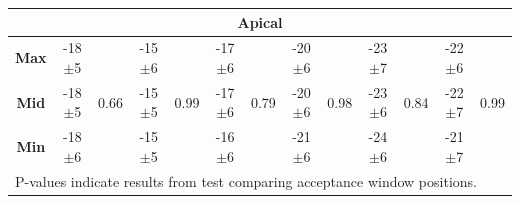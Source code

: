 \begin{landscape}
\begin{table}
\begin{tabular}{ccccccccccccc}
			\multicolumn{13}{c}{\textbf{Apical}} \\
			\midrule
			\textbf{Max} & -18$\pm$5 & \multirow{3}{*}{0.66} & -15$\pm$6 & \multirow{3}{*}{0.99} & -17$\pm$6 & \multirow{3}{*}{0.79}
			& -20$\pm$6 & \multirow{3}{*}{0.98} & -23$\pm$7 & \multirow{3}{*}{0.84} & -22$\pm$6 & \multirow{3}{*}{0.99} \\
			\textbf{Mid} & -18$\pm$5 &                       & -15$\pm$5 &                       & -17$\pm$6 & 
			& -20$\pm$6 &                       & -23$\pm$6 &                       & -22$\pm$7 &                       \\
			\textbf{Min} & -18$\pm$6 &                       & -15$\pm$5 &                       & -16$\pm$6 & 
			& -21$\pm$6 &                       & -24$\pm$6 &                       & -21$\pm$7 & \\ 
			\bottomrule
			\multicolumn{13}{l}{P-values indicate results from test comparing acceptance window positions.}
		\end{tabular}
	\end{table}
	\end{landscape}
	
